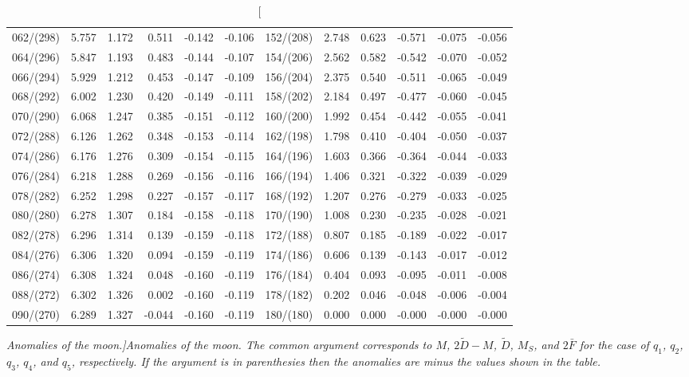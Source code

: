 \begin{table}
{\begin{tabular}{rrrrrr|rrrrrr}
062/(298) &  5.757 &  1.172 &  0.511 & -0.142 & -0.106 & 152/(208) &  2.748 &  0.623 & -0.571 & -0.075 & -0.056\\
064/(296) &  5.847 &  1.193 &  0.483 & -0.144 & -0.107 & 154/(206) &  2.562 &  0.582 & -0.542 & -0.070 & -0.052\\
066/(294) &  5.929 &  1.212 &  0.453 & -0.147 & -0.109 & 156/(204) &  2.375 &  0.540 & -0.511 & -0.065 & -0.049\\
068/(292) &  6.002 &  1.230 &  0.420 & -0.149 & -0.111 & 158/(202) &  2.184 &  0.497 & -0.477 & -0.060 & -0.045\\
070/(290) &  6.068 &  1.247 &  0.385 & -0.151 & -0.112 & 160/(200) &  1.992 &  0.454 & -0.442 & -0.055 & -0.041\\
072/(288) &  6.126 &  1.262 &  0.348 & -0.153 & -0.114 & 162/(198) &  1.798 &  0.410 & -0.404 & -0.050 & -0.037\\
074/(286) &  6.176 &  1.276 &  0.309 & -0.154 & -0.115 & 164/(196) &  1.603 &  0.366 & -0.364 & -0.044 & -0.033\\
076/(284) &  6.218 &  1.288 &  0.269 & -0.156 & -0.116 & 166/(194) &  1.406 &  0.321 & -0.322 & -0.039 & -0.029\\
078/(282) &  6.252 &  1.298 &  0.227 & -0.157 & -0.117 & 168/(192) &  1.207 &  0.276 & -0.279 & -0.033 & -0.025\\
080/(280) &  6.278 &  1.307 &  0.184 & -0.158 & -0.118 & 170/(190) &  1.008 &  0.230 & -0.235 & -0.028 & -0.021\\
082/(278) &  6.296 &  1.314 &  0.139 & -0.159 & -0.118 & 172/(188) &  0.807 &  0.185 & -0.189 & -0.022 & -0.017\\
084/(276) &  6.306 &  1.320 &  0.094 & -0.159 & -0.119 & 174/(186) &  0.606 &  0.139 & -0.143 & -0.017 & -0.012\\
086/(274) &  6.308 &  1.324 &  0.048 & -0.160 & -0.119 & 176/(184) &  0.404 &  0.093 & -0.095 & -0.011 & -0.008\\
088/(272) &  6.302 &  1.326 &  0.002 & -0.160 & -0.119 & 178/(182) &  0.202 &  0.046 & -0.048 & -0.006 & -0.004\\
090/(270) &  6.289 &  1.327 & -0.044 & -0.160 & -0.119 & 180/(180) &  0.000 &  0.000 & -0.000 & -0.000 & -0.000\\
\end{tabular}}
\caption[\em Anomalies of the moon.]{\em Anomalies of the moon. The common argument corresponds to
$M$, $2\tilde{D}-M$, $\tilde{D}$, $M_S$, and $2\bar{F}$ for the case of
$q_1$, $q_2$, $q_3$, $q_4$, and $q_5$, respectively. If the argument is
in parenthesies then the anomalies are minus the values shown
in the table. }\label{tmoona}
\end{table}

